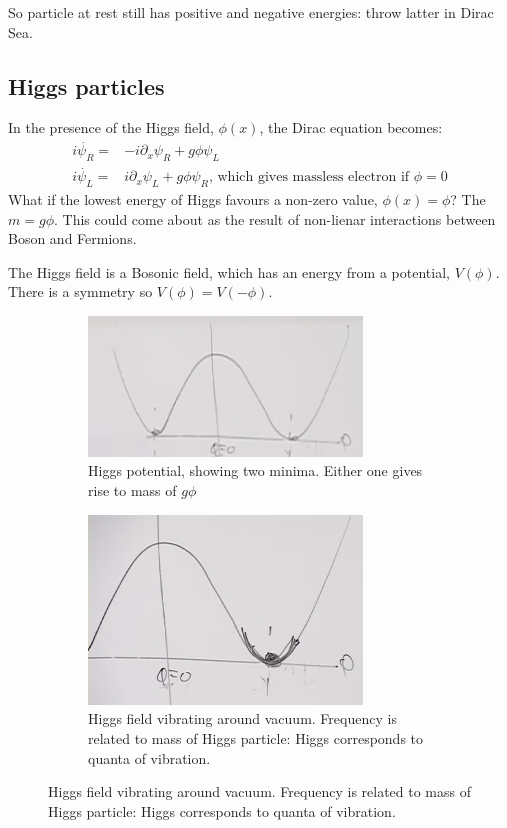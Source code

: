 \documentclass[]{article}
\begin{document}
So particle at rest still has positive and negative energies: throw latter in Dirac Sea.

\subsection{Higgs particles}

In the presence of the Higgs field, $\phi(x)$, the Dirac equation becomes:
\begin{align*}
	i \dot{\psi_R} =& -i \partial_x \psi_R + g \phi \psi_L\\
	i \dot{\psi_L} =& i \partial_x \psi_L + g \phi \psi_R \text{, which gives massless electron if $\phi=0$}
\end{align*}
What if the lowest energy of Higgs favours a non-zero value, $\phi(x)=\phi$? The $m=g\phi$. This could come about as the result of non-lienar interactions between Boson and Fermions.

The Higgs field is a Bosonic field, which has an energy from a potential, $V(\phi)$. There is a symmetry so $V(\phi)=V(-\phi)$.

\begin{figure}[H]
	\caption[Higgs potential]{Higgs potential: reason for shape not fully understood at time of lecture.}
	\begin{subfigure}{0.5\textwidth}
		\caption{Higgs potential, showing two minima. Either one gives rise to mass of $g\phi$}\label{fig:higgs:potential}
		\includegraphics[width=0.8\textwidth]{higgs-potential}
	\end{subfigure}
	\begin{subfigure}{0.5\textwidth}
		\caption{Higgs field vibrating around vacuum. Frequency is related to mass of Higgs particle: Higgs corresponds to quanta of vibration.}
		\includegraphics[width=0.8\textwidth]{higgs-vibrating}
	\end{subfigure}
\end{figure}
\end{document}
